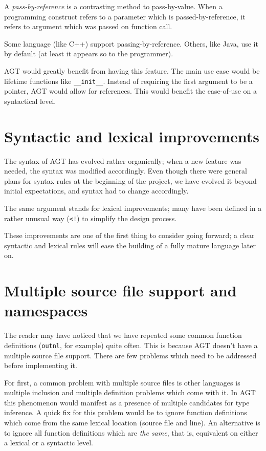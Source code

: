 \documentclass[times, utf8, diplomski]{fer}
\theoremstyle{definition}
\begin{document}
A \textit{pass-by-reference} is a contrasting method to pass-by-value. When a programming construct 
refers to a parameter which is passed-by-reference, it refers to argument which was passed on
function call.

Some language (like C++) support passing-by-reference. Others, like Java, use it by default 
(at least it appears so to the programmer).

AGT would greatly benefit from having this feature. The main use case would be
lifetime functions like \texttt{\_\_init\_\_}. Instead of requiring the first argument to be a pointer,
AGT would allow for references. This would benefit the ease-of-use on a syntactical level.

\section{Syntactic and lexical improvements}

The syntax of AGT has evolved rather organically; when a new feature was needed,
the syntax was modified accordingly. Even though there were general plans for syntax rules
at the beginning of the project, we have evolved it beyond initial expectations,
and syntax had to change accordingly.

The same argument stands for lexical improvements; many have been defined in a rather unusual way
(\texttt{<!}) to simplify the design process.

These improvements are one of the first thing to consider going forward;
a clear syntactic and lexical rules will ease the building of a fully mature language later on.

\section{Multiple source file support and namespaces}

The reader may have noticed that we have repeated some common function definitions
(\texttt{outnl}, for example) quite often. This is because AGT doesn't have a multiple source file
support. There are few problems which need to be addressed before implementing it.

For first, a common problem with multiple source files is other languages is multiple inclusion
and multiple definition problems which come with it. In AGT this phenomenon would manifest
as a presence of multiple candidates for type inference. A quick fix for this problem would be
to ignore function definitions which come from the same lexical location (source file and line).
An alternative is to ignore all function definitions which are \textit{the same}, that is,
equivalent on either a lexical or a syntactic level.
\end{document}
